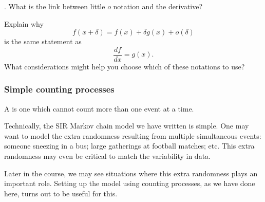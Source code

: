 \documentclass{beamer}\usepackage[]{graphicx}\usepackage[]{color}
\newcommand\answer[2]{#1} %
\begin{document}
\begin{frame}[fragile]

\myquestion. What is the link between little $o$ notation and the derivative?

Explain why 
$$f(x+\delta)=f(x)+ \delta g(x) + o(\delta)$$ 
is the same statement as
$$ \frac{df}{dx} = g(x).$$
What considerations might help you choose which of these notations to use?

\answer{\vspace{50mm}}{todo}

\end{frame}

%
%
%

\begin{frame}[fragile]

\frametitle{Simple counting processes}

\bi

\item A  is one which cannot count more than one event at a time.

\item Technically, the SIR Markov chain model we have written is simple. One may want to model the extra randomness resulting from multiple simultaneous events: someone sneezing in a bus; large gatherings at football matches; etc. This extra randomness may even be critical to match the variability in data. 

\item Later in the course, we may see situations where this extra randomness plays an important role. Setting up the model using counting processes, as we have done here, turns out to be useful for this.

\ei

\end{frame}
\end{document}
